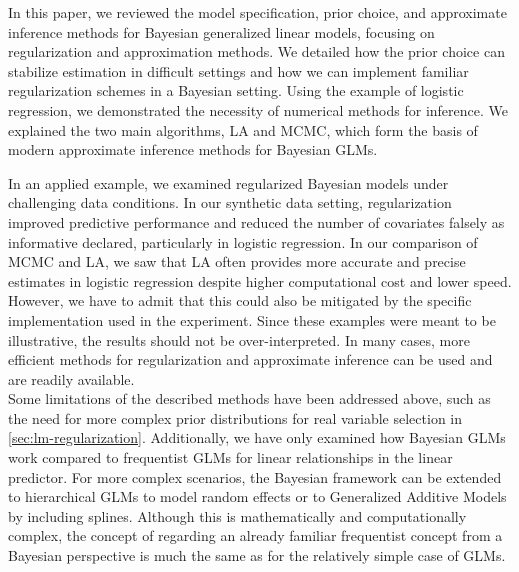 In this paper, we reviewed the model specification, prior choice, and approximate inference methods for Bayesian generalized linear models, focusing on regularization and approximation methods.
We detailed how the prior choice can stabilize estimation in difficult settings and how we can implement familiar regularization schemes in a Bayesian setting.
Using the example of logistic regression, we demonstrated the necessity of numerical methods for inference. We explained the two main algorithms, LA and MCMC, which form the basis of modern approximate inference methods for Bayesian GLMs.

In an applied example, we examined regularized Bayesian models under challenging data conditions.
In our synthetic data setting, regularization improved predictive performance and reduced the number of covariates falsely as informative declared, particularly in logistic regression.
In our comparison of MCMC and LA, we saw that LA often provides more accurate and precise estimates in logistic regression despite higher computational cost and lower speed. However, we have to admit that this could also be mitigated by the specific implementation used in the experiment.
Since these examples were meant to be illustrative, the results should not be over-interpreted.
In many cases, more efficient methods for regularization and approximate inference can be used and are readily available.\\

Some limitations of the described methods have been addressed above, such as the need for more complex prior distributions for real variable selection in \autoref{sec:lm-regularization}.
Additionally, we have only examined how Bayesian GLMs work compared to frequentist GLMs for linear relationships in the linear predictor.
For more complex scenarios, the Bayesian framework can be extended to hierarchical GLMs to model random effects or to Generalized Additive Models by including splines.
Although this is mathematically and computationally complex, the concept of regarding an already familiar frequentist concept from a Bayesian perspective is much the same as for the relatively simple case of GLMs.
